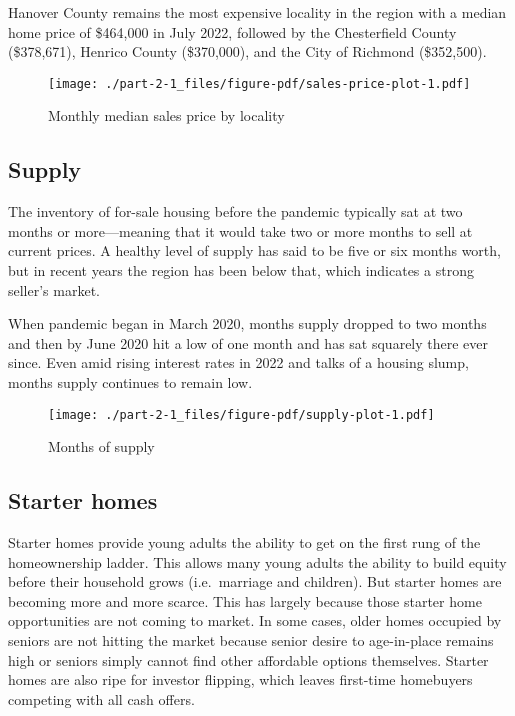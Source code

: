 \documentclass[
  letterpaper,
  DIV=11,
  numbers=noendperiod]{scrreprt}
\begin{document}
Hanover County remains the most expensive locality in the region with a
median home price of \$464,000 in July 2022, followed by the
Chesterfield County (\$378,671), Henrico County (\$370,000), and the
City of Richmond (\$352,500).

\begin{figure}

{\centering \texttt{[image: ./part-2-1\_files/figure-pdf/sales-price-plot-1.pdf]}

}

\caption{Monthly median sales price by locality}

\end{figure}

\hypertarget{supply-1}{%
\subsection{Supply}\label{supply-1}}

The inventory of for-sale housing before the pandemic typically sat at
two months or more---meaning that it would take two or more months to
sell at current prices. A healthy level of supply has said to be five or
six months worth, but in recent years the region has been below that,
which indicates a strong seller's market.

When pandemic began in March 2020, months supply dropped to two months
and then by June 2020 hit a low of one month and has sat squarely there
ever since. Even amid rising interest rates in 2022 and talks of a
housing slump, months supply continues to remain low.

\begin{figure}

{\centering \texttt{[image: ./part-2-1\_files/figure-pdf/supply-plot-1.pdf]}

}

\caption{Months of supply}

\end{figure}

\hypertarget{starter-homes}{%
\subsection{Starter homes}\label{starter-homes}}

Starter homes provide young adults the ability to get on the first rung
of the homeownership ladder. This allows many young adults the ability
to build equity before their household grows (i.e.~marriage and
children). But starter homes are becoming more and more scarce. This has
largely because those starter home opportunities are not coming to
market. In some cases, older homes occupied by seniors are not hitting
the market because senior desire to age-in-place remains high or seniors
simply cannot find other affordable options themselves. Starter homes
are also ripe for investor flipping, which leaves first-time homebuyers
competing with all cash offers.
\end{document}
